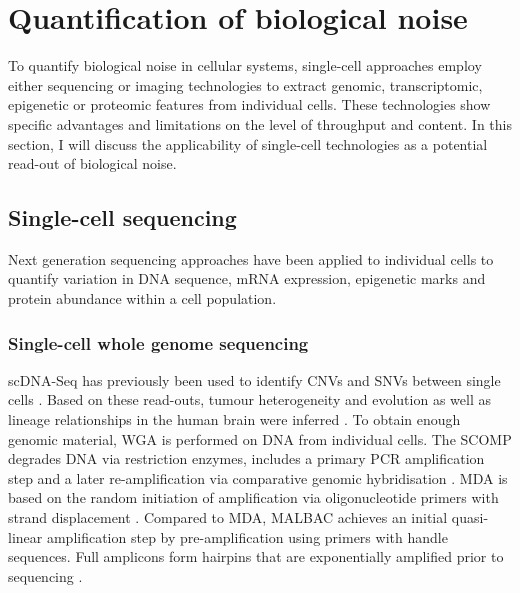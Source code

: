 
\section{Quantification of biological noise} 

To quantify biological noise in cellular systems, single-cell approaches employ either sequencing or imaging technologies to extract genomic, transcriptomic, epigenetic or proteomic features from individual cells. These technologies show specific advantages and limitations on the level of throughput and content. In this section, I will discuss the applicability of single-cell technologies as a potential read-out of biological noise.

\subsection{Single-cell sequencing}

Next generation sequencing approaches have been applied to individual cells to quantify variation in DNA sequence, mRNA expression, epigenetic marks and protein abundance within a cell population. 

\subsubsection{Single-cell whole genome sequencing}

\Gls{scDNA-Seq} has previously been used to identify CNVs and SNVs between single cells \citep{Shpunt2012}. Based on these read-outs, tumour heterogeneity and evolution \citep{Navin2011} as well as lineage relationships in the human brain were inferred \citep{Evrony2015}. To obtain enough genomic material, \gls{WGA} is performed on DNA from individual cells. The \gls{SCOMP} degrades DNA via restriction enzymes, includes a primary \gls{PCR} amplification step and a later re-amplification via comparative genomic hybridisation \citep{Klein1999}. \Gls{MDA} is based on the random initiation of amplification via oligonucleotide primers with strand displacement \citep{Dean2002}. Compared to MDA, \gls{MALBAC} achieves an initial quasi-linear amplification step by pre-amplification using primers with handle sequences. Full amplicons form hairpins that are exponentially amplified prior to sequencing \citep{Shpunt2012}. \\

